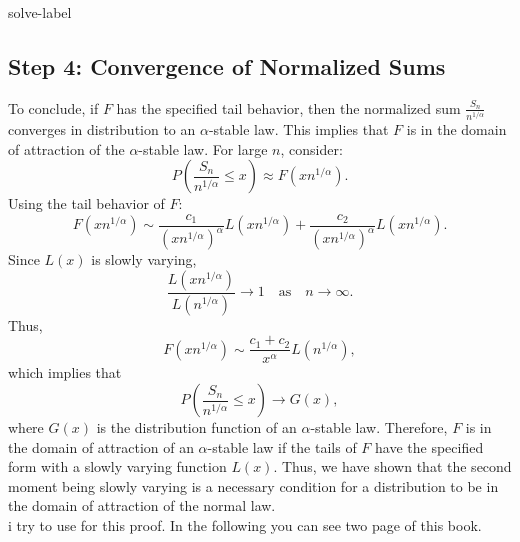 \begin{solve}{}{solve-label}
\subsection*{Step 4: Convergence of Normalized Sums} To conclude, if \( F \) has the specified tail behavior, then the normalized sum \( \frac{S_n}{n^{1/\alpha}} \) converges in distribution to an \(\alpha\)-stable law. This implies that \( F \) is in the domain of attraction of the \(\alpha\)-stable law. For large \( n \), consider: \[ P\left( \frac{S_n}{n^{1/\alpha}} \leq x \right) \approx F\left( x n^{1/\alpha} \right). \] Using the tail behavior of \( F \): \[ F\left( x n^{1/\alpha} \right) \sim \frac{c_1}{(x n^{1/\alpha})^\alpha} L(x n^{1/\alpha}) + \frac{c_2}{(x n^{1/\alpha})^\alpha} L(x n^{1/\alpha}). \] Since \( L(x) \) is slowly varying, \[ \frac{L(x n^{1/\alpha})}{L(n^{1/\alpha})} \to 1 \quad \text{as} \quad n \to \infty. \] Thus, \[ F\left( x n^{1/\alpha} \right) \sim \frac{c_1 + c_2}{x^\alpha} L(n^{1/\alpha}), \] which implies that \[ P\left( \frac{S_n}{n^{1/\alpha}} \leq x \right) \to G(x), \] where \( G(x) \) is the distribution function of an \(\alpha\)-stable law. Therefore, \( F \) is in the domain of attraction of an \(\alpha\)-stable law if the tails of \( F \) have the specified form with a slowly varying function \( L(x) \). Thus, we have shown that the second moment being slowly varying is a necessary condition for a distribution to be in the domain of attraction of the normal law.\\
i try to use \cite{r8}  for this proof. In the following you can see two page of this book.

\end{solve}
